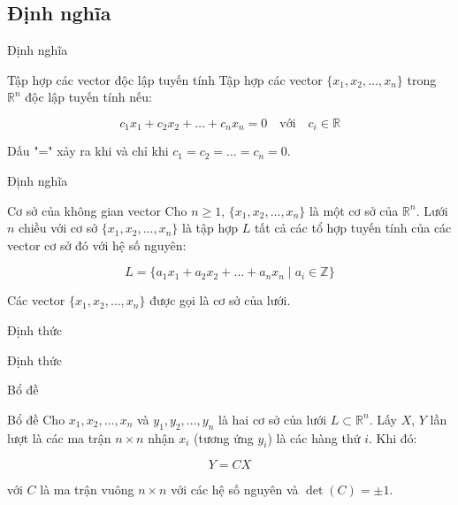 \documentclass{beamer}
\numberwithin{equation}{section}
\begin{document}
\subsection{Định nghĩa}
\begin{frame}{Định nghĩa}
\begin{block}{Tập hợp các vector độc lập tuyến tính}
Tập hợp các vector \(\{x_1, x_2, \ldots, x_n\}\) trong \(\mathbb{R}^n\) độc lập tuyến tính nếu:

\begin{equation}
c_1 x_1 + c_2 x_2 + \ldots + c_n x_n = 0 \quad \text{với} \quad c_i \in \mathbb{R}
\end{equation}

Dấu "=" xảy ra khi và chỉ khi \(c_1 = c_2 = \ldots = c_n = 0 \).

\end{block}
\end{frame}
\begin{frame}{Định nghĩa}
\begin{block}{Cơ sở của không gian vector}
Cho \(n \geq 1 \), \(\{x_1, x_2, \ldots, x_n\}\) là một cơ sở của \(\mathbb{R}^n\).
Lưới \(n \) chiều với cơ sở \(\{x_1, x_2, \ldots, x_n\}\)
là tập hợp \(L \) tất cả các tổ hợp tuyến tính của các vector cơ sở đó với hệ số nguyên:

\begin{equation}
L = \{a_1 x_1 + a_2 x_2 + \ldots + a_n x_n \mid a_i \in \mathbb{Z} \}
\end{equation}

Các vector \(\{x_1, x_2, \ldots, x_n\}\) được gọi là cơ sở của lưới.
\end{block}
\end{frame}
\begin{frame}{Định thức}
\begin{block}{Định thức}

\end{block}
\end{frame}
\begin{frame}{Bổ đề}
\begin{block}{Bổ đề}
Cho $x_1, x_2, \ldots, x_n$ và $y_1, y_2, \ldots, y_n$ là hai cơ sở của lưới $L \subset \mathbb{R}^n$.
Lấy $X$, $Y$ lần lượt là các ma trận $n \times n$ nhận $x_i$ (tương ứng $y_i$) là các hàng thứ $i$.
Khi đó:

\begin{equation} \label{equation:bo_de}
Y = CX
\end{equation}

với $C$ là ma trận vuông $n \times n$ với các hệ số nguyên
và $\det(C) = \pm 1$.
\end{block}
\end{frame}
\end{document}
